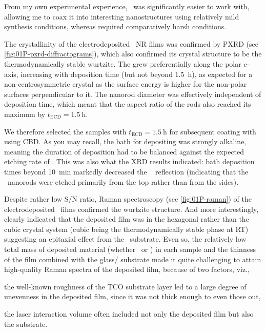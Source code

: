 \documentclass[draft,webedition,openright,titles,swedish,english]{LuaUUThesis}\usepackage[]{graphicx}\usepackage[]{xcolor}
\newcommand{\viz}{viz.}
\newcommand{\namely}{\viz}
\begin{document}
From my own experimental experience, \ZnO\ was significantly easier
to work with, allowing me to coax it into interesting nanostructures
using relatively mild synthesis conditions, whereas  required
comparatively harsh conditions.

The crystallinity of the electrodeposited \ZnO\ \gls{NR} films was confirmed
by \gls{PXRD} (see \cref{fig:01P-pxrd-diffractograms}), which also
confirmed its crystal structure to be the thermodynamically stable wurtzite.
The  grew preferentially along the polar $c$-axis, increasing
with deposition time (but not beyond \qty{1.5}{\hour}), as expected
for a non-centrosymmetric crystal as the surface energy is higher for the
non-polar surfaces perpendicular to it.
The nanorod diameter was effectively independent of deposition time, which meant
that the aspect ratio of the rods also reached its maximum by $t_\mathrm{ECD}=\qty{1.5}{\hour}$.

We therefore selected the samples with $t_\mathrm{ECD}=\qty{1.5}{\hour}$ for
subsequent coating with  using \gls{CBD}.
As you may recall, the bath for depositing  was strongly alkaline, meaning
the duration of  deposition had to be balanced against the expected
etching rate of \ZnO.
This was also what the \gls{XRD} results indicated:
bath deposition times beyond \qty{10}{\minute} markedly decreased the \zincox\
 reflection (indicating that the \ZnO\ nanorods were etched primarily
from the top rather than from the sides).


Despite rather low S/N ratio, Raman spectroscopy (see \cref{fig:01P-raman}) of the
electrodeposited \ZnO\ films confirmed the wurtzite structure. And more interestingly,
clearly indicated that the deposited  film was in the hexagonal rather than
the cubic crystal system (cubic \ch{CdS} being the thermodynamically stable phase at \gls{RT})
suggesting an epitaxial effect from the \ZnO\ substrate.
Even so, the relatively low total mass of deposited material (whether \ZnO\ or )
in each sample and the thinness of the film combined with the glass/\glsxtrshort{TCO} substrate
made it quite challenging to attain high-quality Raman spectra of the deposited film,
because of two factors, \namely,
\begin{enumerate*}[label=(\alph*)]
\item the well-known roughness of the \gls{TCO} substrate layer led to a large
   degree of unevenness in the deposited film, since it was not thick enough
   to even those out,
\item the laser interaction volume often included not only the deposited film
   but also the \glsxtrshort{TCO} substrate.
\end{enumerate*}
\end{document}
